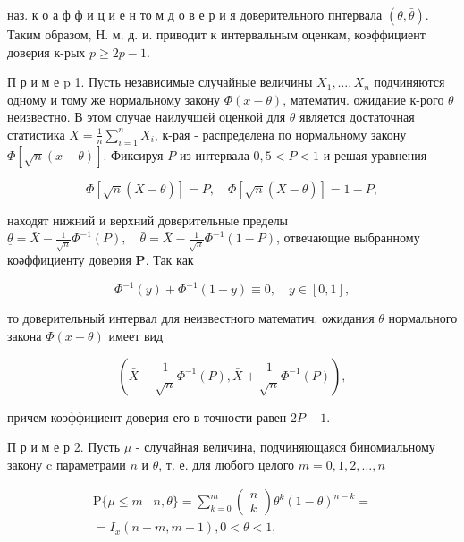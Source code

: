 \documentclass[10pt]{article}
\begin{document}
наз. к о а ф ф и ц и е н то м д о в е р и я доверительного пнтервала $(\theta, \bar{\theta})$. Таким образом, Н. м. д. и. приводит к интервальным оценкам, коэффициент доверия к-рых $p \geqslant 2 p-1$.



П р и м е p 1. Пусть независимые случайные величины $X_{1}, \ldots, X_{n}$ подчиняются одному и тому же нормальному закону $\Phi(x-\theta)$, математич. ожидание к-рого $\theta$ неизвестно. В этом случае наилучшей оценкой для $\theta$ является достаточная статистика $X=\frac{1}{n} \sum_{i=1}^{n} X_{i}$, к-рая - распределена по нормальному закону $\Phi[\sqrt{n}(x-\theta)]$. Фиксируя $P$ из интервала $0,5<P<1$ и решая уравнения



\[

\Phi[\sqrt{n}(\bar{X}-\theta)]=P, \quad \Phi[\sqrt{n}(\bar{X}-\theta)]=1-P,

\]



находят нижний и верхний доверительные пределы $\underline{\theta}=\bar{X}-\frac{1}{\sqrt{n}} \Phi^{-1}(P), \quad \bar{\theta}=\bar{X}-\frac{1}{\sqrt{n}} \Phi^{-1}(1-P)$, отвечающие выбранному коәффициенту доверия $\boldsymbol{P}$. Так как



\[

\Phi^{-1}(y)+\Phi^{-1}(1-y) \equiv 0, \quad y \in[0,1],

\]



то доверительный интервал для неизвестного математич. ожидания $\theta$ нормального закона $\Phi(x-\theta)$ имеет вид



\[

\left(\bar{X}-\frac{1}{\sqrt{n}} \Phi^{-1}(P), \bar{X}+\frac{1}{\sqrt{n}} \Phi^{-1}(P)\right),

\]



причем коэффициент доверия его в точности равен $2 P-1$.



П р и м е р 2. Пусть $\mu$ - случайная величина, подчиняющаяся биномиальному закону $\mathrm{c}$ параметрами $n$ и $\theta$, т. е. для любого целого $m=0,1,2, \ldots, n$



\[

\begin{gathered}

\mathrm{P}\{\mu \leqslant m \mid n, \theta\}=\sum_{k=0}^{m}\left(\begin{array}{l}

n \\

k

\end{array}\right) \theta^{k}(1-\theta)^{n-k}= \\

=I_{x}(n-m, m+1), 0<\theta<1,

\end{gathered}

\]
\end{document}
